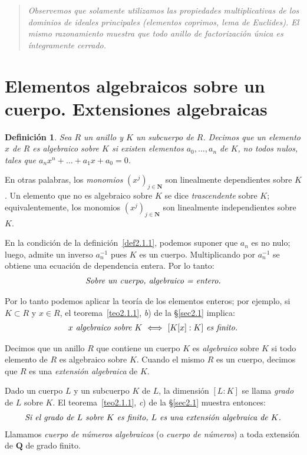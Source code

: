\documentclass[bibtotoc,leqno,spanish]{amsbook}
\newcommand{\QQ}{\mathbf{Q}}
\newcommand{\NN}{\mathbf{N}}
\numberwithin{equation}{section}
\newenvironment{comm}%
	{\begin{quotation}\itshape\Small}
	{\end{quotation}}
\theoremstyle{note}
\newtheorem*{definition*}{Definici\'on}
\theoremstyle{note}
\theoremstyle{rem}
\numberwithin{theorem}{section}
\numberwithin{proposition}{section}
\numberwithin{definition}{section}
\numberwithin{lemma}{section}
\numberwithin{corollary}{section}
\numberwithin{example}{section}
\numberwithin{footnote}{section}%
\begin{document}
\begin{comm}
Observemos que solamente utilizamos las propiedades multiplicativas de los dominios de ideales principales
(elementos coprimos, lema de Euclides). El mismo razonamiento muestra que todo anillo de {\em factorizaci\'on
\'unica} es \'integramente cerrado.
\end{comm}

\section[Elementos algebraicos sobre un cuerpo]{Elementos algebraicos sobre un cuerpo. Extensiones algebraicas}
\label{sec2.3}

\begin{definition*}
Sea $R$ un anillo y $K$ un subcuerpo de $R$. Decimos que un elemento $x$ de $R$ es \emph{algebraico sobre $K$} si
existen elementos $a_{0},\dots,a_{n}$ de $K$, no todos nulos, tales que $a_{n}x^{n}+\dots+a_{1}x+a_{0}=0$.
\end{definition*}

En otras palabras, los {\em monomios} $(x^{j})_{j\in\NN}$ son linealmente dependientes sobre $K$.
Un elemento que no es algebraico sobre $K$ se dice {\em trascendente} sobre $K$; equivalentemente, los
monomios $(x^{j})_{j\in\NN}$ son linealmente independientes sobre $K$.

En la condici\'on de la definici\'on~\ref{def2.1.1},
podemos suponer que $a_{n}$ es no nulo; luego, admite un inverso
$a_{n}^{-1}$ pues $K$ es un cuerpo. Multiplicando por $a_{n}^{-1}$ se obtiene una
ecuaci\'on de dependencia entera. Por lo tanto:
\begin{gather}
\text{\itshape Sobre un cuerpo, algebraico = entero.}
\end{gather}

Por lo tanto podemos aplicar la teor\'ia de los elementos enteros; por ejemplo, si $K\subset R$ y $x\in R$,
el teorema~\ref{teo2.1.1}, {\itshape b}) de la \S\ref{sec2.1} implica:
\begin{gather}
\text{\itshape $x$ algebraico sobre $K$ $\iff$ $[K[x]:K]$ es finito.}
\end{gather}

Decimos que un anillo $R$ que contiene un cuerpo $K$ es {\em algebraico} sobre $K$ si todo elemento de $R$
es algebraico sobre $K$. Cuando el mismo $R$ es un cuerpo, decimos que $R$ es una {\em extensi\'on algebraica}
de $K$.

Dado un cuerpo $L$ y un subcuerpo $K$ de $L$, la dimensi\'on $[L:K]$ se llama {\em grado} de $L$ sobre $K$.
El teorema~\ref{teo2.1.1}, {\itshape c}) de la \S\ref{sec2.1} muestra entonces:
\begin{gather}
\text{\itshape Si el grado de $L$ sobre $K$ es finito, $L$ es una extensi\'on algebraica de $K$.}
\end{gather}
Llamamos {\em cuerpo de n\'umeros algebraicos} (o {\em cuerpo de n\'umeros}) a toda extensi\'on de $\QQ$
de grado finito.
\end{document}
